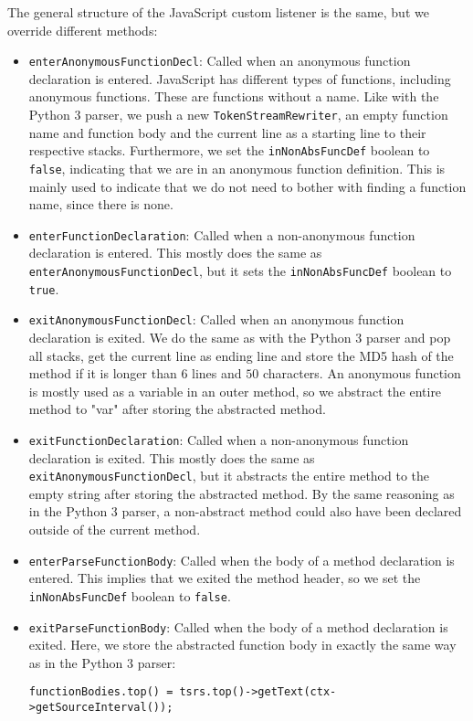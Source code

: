 \documentclass[../Main.tex]{subfiles}
\begin{document}
The general structure of the JavaScript custom listener is the same, but we override different methods:
\begin{itemize}
    \item \texttt{enterAnonymousFunctionDecl}: Called when an anonymous function declaration is entered. JavaScript has different types of functions, including anonymous functions. These are functions without a name. Like with the Python 3 parser, we push a new \texttt{TokenStreamRewriter}, an empty function name and function body and the current line as a starting line to their respective stacks. Furthermore, we set the \texttt{inNonAbsFuncDef} boolean to \texttt{false}, indicating that we are in an anonymous function definition. This is mainly used to indicate that we do not need to bother with finding a function name, since there is none.
    \item \texttt{enterFunctionDeclaration}: Called when a non-anonymous function declaration is entered. This mostly does the same as \texttt{enterAnonymousFunctionDecl}, but it sets the \texttt{inNonAbsFuncDef} boolean to \texttt{true}.
    \item \texttt{exitAnonymousFunctionDecl}: Called when an anonymous function declaration is exited. We do the same as with the Python 3 parser and pop all stacks, get the current line as ending line and store the MD5 hash of the method if it is longer than $6$ lines and $50$ characters. An anonymous function is mostly used as a variable in an outer method, so we abstract the entire method to "var" after storing the abstracted method.
    \item \texttt{exitFunctionDeclaration}: Called when a non-anonymous function declaration is exited. This mostly does the same as \texttt{exitAnonymousFunctionDecl}, but it abstracts the entire method to the empty string after storing the abstracted method. By the same reasoning as in the Python 3 parser, a non-abstract method could also have been declared outside of the current method.
    \item \texttt{enterParseFunctionBody}: Called when the body of a method declaration is entered. This implies that we exited the method header, so we set the \texttt{inNonAbsFuncDef} boolean to \texttt{false}.
    \item \texttt{exitParseFunctionBody}: Called when the body of a method declaration is exited. Here, we store the abstracted function body in exactly the same way as in the Python 3 parser:
    \begin{lstlisting}
functionBodies.top() = tsrs.top()->getText(ctx->getSourceInterval());

\end{lstlisting}
\end{itemize}
\end{document}
